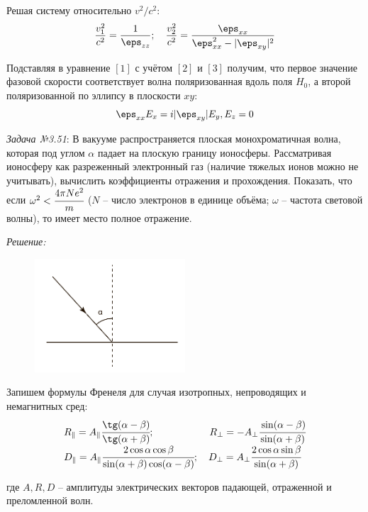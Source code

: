 Решая систему относительно \( v^2 / c^2 \):
\[
	\frac{v^2_1}{c^2} = \frac{1}{\eps_{zz}};\quad
	\frac{v^2_2}{c^2} = \frac{\eps_{xx}}{\eps^2_{xx} - 
		\vert\eps_{xy}\vert^2}
\]

Подставляя в уравнение \( [1] \) с учётом \( [2] \) и \( [3] \) получим, что 
первое значение фазовой скорости соответствует волна поляризованная вдоль 
поля \( H_0 \), а второй поляризованной по эллипсу в плоскости \( xy \):
\[
	\eps_{xx} E_x = i\vert\eps_{xy}\vert E_y, E_z = 0
\]  

\newpage

\emph{Задача №3.51}: В вакууме распространяется плоская монохроматичная 
волна, которая под углом \( \alpha \) падает на плоскую границу ионосферы. 
Рассматривая ионосферу как разреженный электронный газ (наличие тяжелых 
ионов можно не учитывать), вычислить коэффициенты отражения и прохождения. 
Показать, что если \( \omega^2 < \cfrac{4\pi Ne^2}{m} \) (\(N\) -- число 
электронов в единице объёма; \( \omega \) -- частота световой волны), то 
имеет место полное отражение.

\emph{Решение:}

\begin{figure}[ht]
	\center
	\includegraphics[width=0.5\textwidth]{pdf/image4_2}
\end{figure}

Запишем формулы Френеля для случая изотропных, непроводящих и немагнитных 
сред:
\[
	\begin{array}{ll}
		R_{\Vert} = A_{\Vert}\cfrac{\tg(\alpha-\beta)}{\tg(\alpha+\beta)};
		\hspace{13ex}
		R_{\bot} = -A_{\bot}\cfrac{\sin(\alpha-\beta)}{\sin(\alpha+\beta)} \\
		D_{\Vert} = A_{\Vert}\cfrac{2\cos\alpha\cos\beta}
			{\sin(\alpha+\beta)\cos(\alpha-\beta)};\quad
		D_{\bot} = A_{\bot}\cfrac{2\cos\alpha\sin\beta}{\sin(\alpha+\beta)}
	\end{array}
\]

где \( A, R, D \) -- амплитуды электрических векторов падающей, отраженной 
и преломленной волн.

